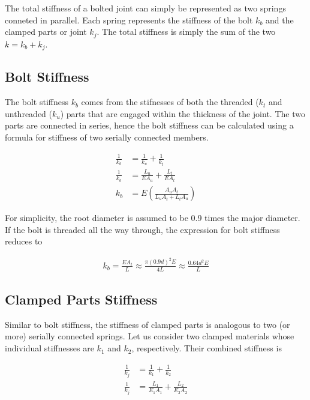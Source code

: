 \documentclass[
10pt,
a4paper,
openany,
svgnames,
]{book}
\begin{document}
The total stiffness of a bolted joint can simply be represented as two springs conneted in parallel. Each spring represents the stiffness of the bolt $k_b$ and the clamped parts or joint $k_j$. The total stiffness is simply the sum of the two $k = k_b + k_j$.

\subsection{Bolt Stiffness}

The bolt stiffness $k_b$ comes from the stifnesses of both the threaded ($k_t$ and unthreaded ($k_u$) parts that are engaged within the thickness of the joint. The two parts are connected in series, hence the bolt stiffness can be calculated using a formula for stiffness of two serially connected members.

\begin{align}
  \frac{1}{k_b} &= \frac{1}{k_u} + \frac{1}{k_{t}} \nonumber \\ 
  \frac{1}{k_b} &= \frac{L_u}{EA_u} + \frac{L_{t}}{EA_{t}} \nonumber \\ 
  k_b &= E\left( \frac{A_uA_{t}}{L_uA_{t} + L_{t}A_u} \right) 
\end{align}

For simplicity, the root diameter is assumed to be 0.9 times the major diameter. If the bolt is threaded all the way through, the expression for bolt stiffness reduces to

\begin{align}
  k_b = \frac{EA_t}{L} \approx \frac{\pi (0.9d)^2 E}{4L} \approx \frac{0.64d^2E}{L}  \label{eqn: bolt stiffness}
\end{align}

\subsection{Clamped Parts Stiffness}

Similar to bolt stiffness, the stiffness of clamped parts is analogous to two (or more) serially connected springs. Let us consider two clamped materials whose individual stiffnesses are $k_1$ and $k_2$, respectively. Their combined stiffness is

\begin{align}
  \frac{1}{k_j} &= \frac{1}{k_1} + \frac{1}{k_2} \nonumber \\ 
  \frac{1}{k_j} &= \frac{L_1}{E_1A_1} + \frac{L_2}{E_2A_2}
\end{align}
\end{document}
